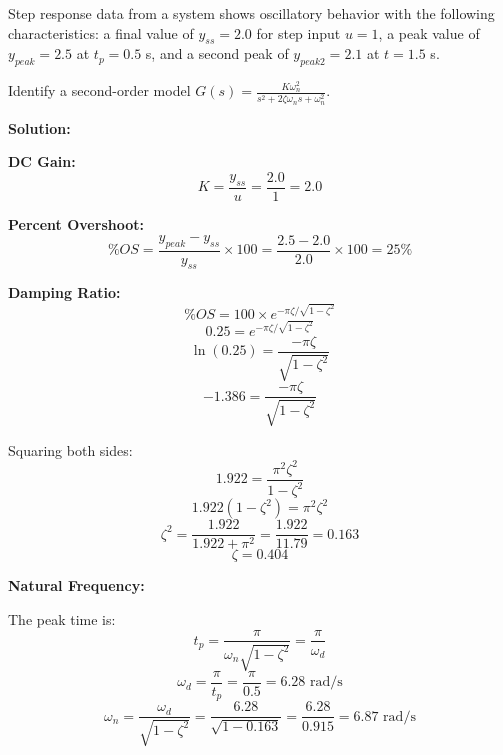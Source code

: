 \begin{example}
\label{ex:second_order}
Step response data from a system shows oscillatory behavior with the following characteristics: a final value of $y_{ss} = 2.0$ for step input $u = 1$, a peak value of $y_{peak} = 2.5$ at $t_p = 0.5$ s, and a second peak of $y_{peak2} = 2.1$ at $t = 1.5$ s.

Identify a second-order model $G(s) = \frac{K\omega_n^2}{s^2 + 2\zeta\omega_n s + \omega_n^2}$.

\textbf{Solution:}

\textbf{DC Gain:}
\begin{equation*}
K = \frac{y_{ss}}{u} = \frac{2.0}{1} = 2.0
\end{equation*}

\textbf{Percent Overshoot:}
\begin{equation*}
\%OS = \frac{y_{peak} - y_{ss}}{y_{ss}} \times 100 = \frac{2.5 - 2.0}{2.0} \times 100 = 25\%
\end{equation*}

\textbf{Damping Ratio:}
\begin{equation*}
\%OS = 100 \times e^{-\pi\zeta/\sqrt{1-\zeta^2}}
\end{equation*}
\begin{equation*}
0.25 = e^{-\pi\zeta/\sqrt{1-\zeta^2}}
\end{equation*}
\begin{equation*}
\ln(0.25) = \frac{-\pi\zeta}{\sqrt{1-\zeta^2}}
\end{equation*}
\begin{equation*}
-1.386 = \frac{-\pi\zeta}{\sqrt{1-\zeta^2}}
\end{equation*}

Squaring both sides:
\begin{equation*}
1.922 = \frac{\pi^2\zeta^2}{1-\zeta^2}
\end{equation*}
\begin{equation*}
1.922(1-\zeta^2) = \pi^2\zeta^2
\end{equation*}
\begin{equation*}
\zeta^2 = \frac{1.922}{1.922 + \pi^2} = \frac{1.922}{11.79} = 0.163
\end{equation*}
\begin{equation*}
\zeta = 0.404
\end{equation*}

\textbf{Natural Frequency:}

The peak time is:
\begin{equation*}
t_p = \frac{\pi}{\omega_n\sqrt{1-\zeta^2}} = \frac{\pi}{\omega_d}
\end{equation*}
\begin{equation*}
\omega_d = \frac{\pi}{t_p} = \frac{\pi}{0.5} = 6.28 \text{ rad/s}
\end{equation*}
\begin{equation*}
\omega_n = \frac{\omega_d}{\sqrt{1-\zeta^2}} = \frac{6.28}{\sqrt{1-0.163}} = \frac{6.28}{0.915} = 6.87 \text{ rad/s}
\end{equation*}


\end{example}
